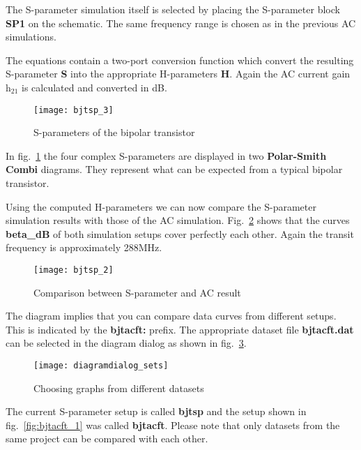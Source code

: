 \medskip

The S-parameter simulation itself is selected by placing the
S-parameter block \textbf{SP1} on the schematic.  The same frequency
range is chosen as in the previous AC simulations.

\medskip

The equations contain a two-port conversion function which convert the
resulting S-parameter \textbf{S} into the appropriate H-parameters
\textbf{H}.  Again the AC current gain $\mathrm{h_{21}}$ is calculated
and converted in dB.

\begin{figure}[ht]
  \centering
  \texttt{[image: bjtsp\_3]}
  \caption{S-parameters of the bipolar transistor}
  \label{fig:bjtsp_3}
\end{figure}
\FloatBarrier

In fig.~\ref{fig:bjtsp_3} the four complex S-parameters are displayed
in two \textbf{Polar-Smith Combi} diagrams.  They represent what can
be expected from a typical bipolar transistor.

\medskip

Using the computed H-parameters we can now compare the S-parameter
simulation results with those of the AC simulation.
Fig.~\ref{fig:bjtsp_2} shows that the curves \textbf{beta\_dB} of both
simulation setups cover perfectly each other.  Again the transit
frequency is approximately 288MHz.

\begin{figure}[ht]
  \centering
  \texttt{[image: bjtsp\_2]}
  \caption{Comparison between S-parameter and AC result}
  \label{fig:bjtsp_2}
\end{figure}
\FloatBarrier

The diagram implies that you can compare data curves from different
setups.  This is indicated by the \textbf{bjtacft:} prefix.  The
appropriate dataset file \textbf{bjtacft.dat} can be selected in the
diagram dialog as shown in fig.~\ref{fig:diagramdialog_sets}.

\begin{figure}[ht]
  \centering
  \texttt{[image: diagramdialog\_sets]}
  \caption{Choosing graphs from different datasets}
  \label{fig:diagramdialog_sets}
\end{figure}
\FloatBarrier

The current S-parameter setup is called \textbf{bjtsp} and the setup
shown in fig.~\ref{fig:bjtacft_1} was called \textbf{bjtacft}.  Please
note that only datasets from the same project can be compared with
each other.

